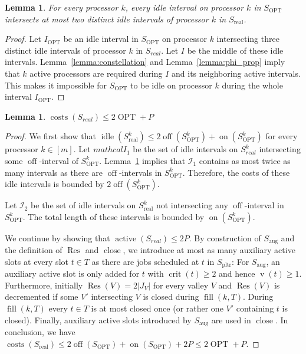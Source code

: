\documentclass[a4paper]{article}
\DeclareMathOperator{\on}{on}
\DeclareMathOperator{\off}{off}
\DeclareMathOperator{\idle}{idle}
\DeclareMathOperator{\act}{active}
\DeclareMathOperator{\costs}{costs}
\DeclareMathOperator{\opt}{OPT}
\DeclareMathOperator{\pltr}{pltr}
\DeclareMathOperator{\aug}{aug}
\DeclareMathOperator{\real}{real}
\DeclareMathOperator{\vol}{v}
\DeclareMathOperator{\crit}{crit}
\DeclareMathOperator{\fillop}{fill}
\DeclareMathOperator{\close}{close}
\DeclareMathOperator{\res}{Res}
\newtheorem{lemma}[theorem]{Lemma}
\begin{document}
\begin{lemma}\label{lemma:intersection}
  For every processor $k$, every idle interval on processor $k$ in $S_{\opt}$ intersects at most two distinct idle intervals of processor $k$ in $S_{\real}$.
\end{lemma}
\begin{proof}
  Let $I_{\opt}$ be an idle interval in $S_{\opt}$ on processor $k$ intersecting three distinct idle intervals of processor $k$ in $S_{real}$.
  Let $I$ be the middle of these idle intervals.
  Lemma~\ref{lemma:constellation} and Lemma~\ref{lemma:phi_prop} imply that $k$ active processors are required during $I$ and its neighboring active intervals.
  This makes it impossible for $S_{\opt}$ to be idle on processor $k$ during the whole interval $I_{\opt}$.
\end{proof}

\begin{lemma}\label{lemma:costs_s_real}
  $\costs(S_{real}) \leq 2 \opt + P$
\end{lemma}
\begin{proof}
  We first show that $\idle(S^k_{\real}) \leq 2 \off(S^k_{\opt}) + \on(S^k_{\opt})$ for every processor $k \in [m]$.
  Let $mathcal{I}_1$ be the set of idle intervals on $S^k_{real}$ intersecting some $\off$-interval of $S^k_{\opt}$.
  Lemma~\ref{lemma:intersection} implies that $\mathcal{I}_1$ contains as most twice as many intervals as there are $\off$-intervals in $S^k_{\opt}$.
  Therefore, the costs of these idle intervals is bounded by $2 \off(S^k_{\opt})$.

  Let $\mathcal{I}_2$ be the set of idle intervals on $S^k_{\real}$ not intersecting any $\off$-interval in $S^k_{\opt}$.
  The total length of these intervals is bounded by $\on(S^k_{\opt})$.

  We continue by showing that $\act(S_{real}) \leq 2 P$.
  By construction of $S_{\aug}$ and the definition of $\res$ and $\close$, we introduce at most as many auxiliary active slots at every slot $t \in T$ as there are jobs scheduled at $t$ in $S_{\pltr}$:
  For $S_{\aug}$, an auxiliary active slot is only added for $t$ with $\crit(t) \geq 2$ and hence $\vol(t) \geq 1$.
  Furthermore, initially $\res(V) = 2 |J_V|$ for every valley $V$ and $\res(V)$ is decremented if some $V'$ intersecting $V$ is closed during $\fillop(k, T)$.
  During $\fillop(k, T)$ every $t \in T$ is at most closed once (or rather one $V'$ containing $t$ is closed).
  Finally, auxiliary active slots introduced by $S_{\aug}$ are used in $\close$.
  In conclusion, we have $\costs(S_{\real}) \leq 2 \off(S_{\opt}) + \on(S_{\opt}) + 2 P \leq 2 \opt + P$.
\end{proof}
\end{document}
